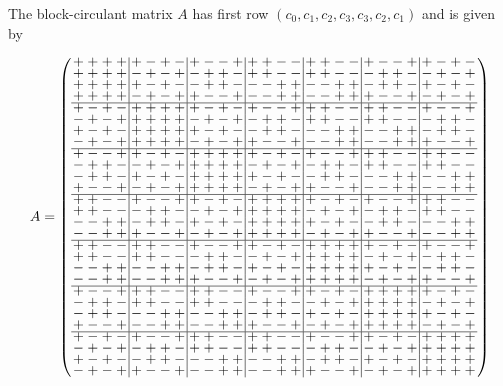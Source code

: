 \documentclass[../../main]{subfiles}
\begin{document}
The block-circulant matrix $A$ has first row $(c_0,c_1,c_2,c_3,c_3,c_2,c_1)$ and is
given by
\begin{tiny}
\[
  A=
  \arraycolsep=1.25pt\def\arraystretch{0.625}
  \left(
    \begin{array}{cccc|cccc|cccc|cccc|cccc|cccc|cccc}
      +&+&+&+&+&-&+&-&+&-&-&+&+&+&-&-&+&+&-&-&+&-&-&+&+&-&+&-\\
      +&+&+&+&-&+&-&+&-&+&+&-&+&+&-&-&+&+&-&-&-&+&+&-&-&+&-&+\\
      +&+&+&+&+&-&+&-&-&+&+&-&-&-&+&+&-&-&+&+&-&+&+&-&+&-&+&-\\
      +&+&+&+&-&+&-&+&+&-&-&+&-&-&+&+&-&-&+&+&+&-&-&+&-&+&-&+\\ \hline
      +&-&+&-&+&+&+&+&+&-&+&-&+&-&-&+&+&+&-&-&+&+&-&-&+&-&-&+\\
      -&+&-&+&+&+&+&+&-&+&-&+&-&+&+&-&+&+&-&-&+&+&-&-&-&+&+&-\\
      +&-&+&-&+&+&+&+&+&-&+&-&-&+&+&-&-&-&+&+&-&-&+&+&-&+&+&-\\
      -&+&-&+&+&+&+&+&-&+&-&+&+&-&-&+&-&-&+&+&-&-&+&+&+&-&-&+\\ \hline
      +&-&-&+&+&-&+&-&+&+&+&+&+&-&+&-&+&-&-&+&+&+&-&-&+&+&-&-\\
      -&+&+&-&-&+&-&+&+&+&+&+&-&+&-&+&-&+&+&-&+&+&-&-&+&+&-&-\\
      -&+&+&-&+&-&+&-&+&+&+&+&+&-&+&-&-&+&+&-&-&-&+&+&-&-&+&+\\
      +&-&-&+&-&+&-&+&+&+&+&+&-&+&-&+&+&-&-&+&-&-&+&+&-&-&+&+\\ \hline
      +&+&-&-&+&-&-&+&+&-&+&-&+&+&+&+&+&-&+&-&+&-&-&+&+&+&-&-\\
      +&+&-&-&-&+&+&-&-&+&-&+&+&+&+&+&-&+&-&+&-&+&+&-&+&+&-&-\\
      -&-&+&+&-&+&+&-&+&-&+&-&+&+&+&+&+&-&+&-&-&+&+&-&-&-&+&+\\
      -&-&+&+&+&-&-&+&-&+&-&+&+&+&+&+&-&+&-&+&+&-&-&+&-&-&+&+\\ \hline
      +&+&-&-&+&+&-&-&+&-&-&+&+&-&+&-&+&+&+&+&+&-&+&-&+&-&-&+\\
      +&+&-&-&+&+&-&-&-&+&+&-&-&+&-&+&+&+&+&+&-&+&-&+&-&+&+&-\\
      -&-&+&+&-&-&+&+&-&+&+&-&+&-&+&-&+&+&+&+&+&-&+&-&-&+&+&-\\
      -&-&+&+&-&-&+&+&+&-&-&+&-&+&-&+&+&+&+&+&-&+&-&+&+&-&-&+\\ \hline
      +&-&-&+&+&+&-&-&+&+&-&-&+&-&-&+&+&-&+&-&+&+&+&+&+&-&+&-\\
      -&+&+&-&+&+&-&-&+&+&-&-&-&+&+&-&-&+&-&+&+&+&+&+&-&+&-&+\\
      -&+&+&-&-&-&+&+&-&-&+&+&-&+&+&-&+&-&+&-&+&+&+&+&+&-&+&-\\
      +&-&-&+&-&-&+&+&-&-&+&+&+&-&-&+&-&+&-&+&+&+&+&+&-&+&-&+\\ \hline
      +&-&+&-&+&-&-&+&+&+&-&-&+&+&-&-&+&-&-&+&+&-&+&-&+&+&+&+\\
      -&+&-&+&-&+&+&-&+&+&-&-&+&+&-&-&-&+&+&-&-&+&-&+&+&+&+&+\\
      +&-&+&-&-&+&+&-&-&-&+&+&-&-&+&+&-&+&+&-&+&-&+&-&+&+&+&+\\
      -&+&-&+&+&-&-&+&-&-&+&+&-&-&+&+&+&-&-&+&-&+&-&+&+&+&+&+\\
    \end{array}
  \right)
\]
\end{tiny}
\end{document}
